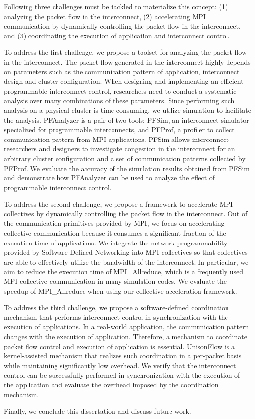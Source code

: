 Following three challenges must be tackled to materialize this concept: (1)
analyzing the packet flow in the interconnect, (2) accelerating MPI
communication by dynamically controlling the packet flow in the interconnect,
and (3) coordinating the execution of application and interconnect control.

To address the first challenge, we propose a toolset for analyzing the packet
flow in the interconnect. The packet flow generated in the interconnect highly
depends on parameters such as the communication pattern of application,
interconnect design and cluster configuration. When designing and implementing
an efficient programmable interconnect control, researchers need to conduct a
systematic analysis over many combinations of these parameters. Since
performing such analysis on a physical cluster is time consuming, we utilize
simulation to facilitate the analysis. PFAnalyzer is a pair of two tools:
PFSim, an interconnect simulator specialized for programmable interconnects,
and PFProf, a profiler to collect communication pattern from MPI applications.
PFSim allows interconnect researchers and designers to investigate congestion
in the interconnect for an arbitrary cluster configuration and a set of
communication patterns collected by PFProf. We evaluate the accuracy of the
simulation results obtained from PFSim and demonstrate how PFAnalyzer can be
used to analyze the effect of programmable interconnect control.

To address the second challenge, we propose a framework to accelerate MPI
collectives by dynamically controlling the packet flow in the interconnect.
Out of the communication primitives provided by MPI, we focus on accelerating
collective communication because it consumes a significant fraction of the
execution time of applications. We integrate the network programmability
provided by Software-Defined Networking into MPI collectives so that
collectives are able to effectively utilize the bandwidth of the interconnect.
In particular, we aim to reduce the execution time of MPI\_Allreduce, which is
a frequently used MPI collective communication in many simulation codes. We
evaluate the speedup of MPI\_Allreduce when using our collective acceleration
framework.

To address the third challenge, we propose a software-defined coordination
mechanism that performs interconnect control in synchronization with the
execution of applications. In a real-world application, the communication
pattern changes with the execution of application. Therefore, a mechanism to
coordinate packet flow control and execution of application is essential.
UnisonFlow is a kernel-assisted mechanism that realizes such coordination in a
per-packet basis while maintaining significantly low overhead. We verify that
the interconnect control can be successfully performed in synchronization with
the execution of the application and evaluate the overhead imposed by the
coordination mechanism.

Finally, we conclude this dissertation and discuss future work.
